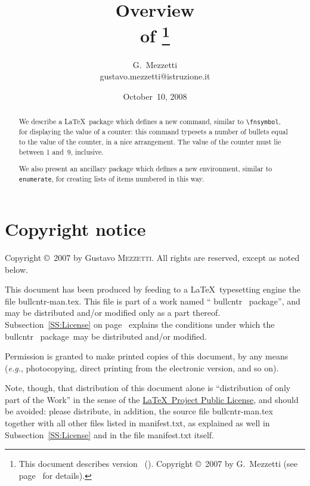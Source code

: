 \documentclass[a4paper]{article}
\title{Overview\\of \tbull
	\thanks{This document describes version \bullvers\ (\bulldate).
		Copyright \copyright~2007 by G.~Mezzetti
		(see page~\pageref{S:Copyright} for details).}}
\author{G.~Mezzetti\\{\ttfamily\normalsize
	gustavo.mezzetti@istruzione.it}}
\date{October~10, 2008}
\newcommand*{\filename}{bullcntr-man.tex}
\DeclareRobustCommand*{\packlass}[1]{%
	{\texorpdfstring{\normalfont \sffamily}{}#1}%
}
\DeclareRobustCommand*{\filedir}[1]{{\normalfont\ttfamily #1}}
\DeclareRobustCommand*{\env}[1]{\texttt{#1}}
\newcommand*{\Bullcntr}{bullcntr}
\newcommand*{\bull}{\packlass{\Bullcntr}}
\newcommand*{\tbull}{the \bull\ package}
\newcommand*{\Enumerat}{enumerate}
\newcommand*{\enenv}{\env{\Enumerat}}
\begin{document}
\maketitle

\begin{abstract}
	We describe a \LaTeX\ package which defines a new command, similar
	to \verb|\fnsymbol|, for displaying the value of a counter: this
	command typesets a number of bullets equal to the value of the
	counter, in a nice arrangement.  The value of the counter must lie
	between 1 and~9, inclusive.
	
	We also present an ancillary package which defines a new
	environment, similar to \enenv, for creating lists of items
	numbered in this way.
\end{abstract}



\tableofcontents



\begingroup

\setlength{\parskip}{\medskipamount}
\setlength{\parindent}{0pt}

\section*{Copyright notice}
\label{S:Copyright}
\vspace{-\parskip}

Copyright \copyright~2007 by Gustavo \textsc{Mezzetti}.  All rights
are reserved, except as noted below.

This document has been produced by feeding to a \LaTeX\ typesetting
engine the file \filedir{\filename}.  This file is part of a work
named ``\bull\ package'', and may be distributed and/or modified only
as a part thereof.  Subsection~\ref{SS:License} on
page~\pageref{SS:License} explains the conditions under which \tbull\
may be distributed and/or modified.

Permission is granted to make printed copies of this document, by any
means (\emph{e.g.}, photocopying, direct printing from the electronic
version, and so on).

Note, though, that distribution of this document alone is
``distribution of only part of the Work'' in the sense of the
\href{http://www.latex-project.org/lppl.txt}{\LaTeX\ Project Public
License}, and should be avoided: please distribute, in addition, the
source file \filedir{\filename} together with all other files listed
in \filedir{manifest.txt}, as explained as well in
Subsection~\ref{SS:License} and in the file \filedir{manifest.txt}
itself.
\end{document}
